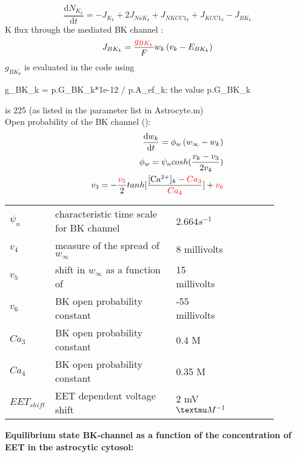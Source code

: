 \documentclass[fleqn]{report}
\numberwithin{equation}{section}
\numberwithin{equation}{section}
\newcommand{\Ca}{\text{Ca$^{2+}$}}
\newcommand{\Cak}{\text{[Ca$^{2+}]_k$}}
\newcommand{\microM}{\textmu M}
\begin{document}
	\begin{equation} \label{eq:KInt}
	\dfrac{\mathrm{d}N_{K_k}}{\mathrm{d}t}=- J_{K_k} + 2 J_{NaK_{k}} + J_{NKCC1_{k}} +  J_{KCC1_{k}}
	- J_{BK_k}  
	\end{equation}
	\gls{K} flux through the \Ca mediated BK channel  : 
	\begin{equation} \label{eq:J_BK}
	J_{BK_k}=\frac{\textcolor{red}{g_{BK_k}}}{F}w_k\left( v_k-E_{BK_k} \right)
	\end{equation}
	$g_{BK_k}$ is evaluated in the code using   
	\begin{verbatim*}
g_BK_k = p.G_BK_k*1e-12 / p.A_ef_k; the value  p.G_BK_k
	\end{verbatim*} 
	is 225 (as listed in the parameter list in Astrocyte.m)\\
	
		Open probability of the BK channel (\pers):
		\begin{eqnarray} \label{eq:dwkdt}
		\frac{\mathrm{d}w_{k}}{\mathrm{d}t} = \phi_{w} \left(w_{\infty}-w_{k} \right) \\
		\phi_{w}=\psi_{n}cosh(\frac{v_{k}-v_{3}}{2v_{4}}) \\
		v_{3}=-\frac{\textcolor{red}{v_{5}}}{2}tanh[\frac{\Cak-\textcolor{red}{Ca_{3}}}{\textcolor{red}{Ca_{4}}}]+\textcolor{red}{v_{6}}
		\end{eqnarray}

						\begin{table}[h!]
							\centering
							\begin{tabular}{ p{0.07\linewidth}  >{\footnotesize} p{0.47\linewidth}  >{\footnotesize} p{0.17\linewidth} >{\footnotesize} p{0.17\linewidth} }
								\hline
								$ \psi_{n} $ 	   & characteristic time scale for BK channel	& $2.664 s^{-1}$ 	& \\ 
								$ v_{4} $ 	       	& measure of the spread of $w_{\infty}$	& 8  millivolts 				& \\ 
								$v_{5}$              & shift in $w_{\infty}$ as a function of \Ca & 15 millivolts 			&  \\
								$v_{6}$              & BK open probability constant  & -55 millivolts 			&  \\
								$Ca_{3}$            & BK open probability constant  & 0.4 \microM  &   \\
								$Ca_{4}$            & BK open probability constant  & 0.35 \microM  &   \\
								$EET_{shift}$    &      EET dependent voltage shift & 2  mV $\uM^{-1}$    &   \\
								\hline
							\end{tabular}
						\end{table}
		\textbf{Equilibrium state BK-channel as a function of the concentration of EET in the astrocytic cytosol:}\\
		
\end{document}
